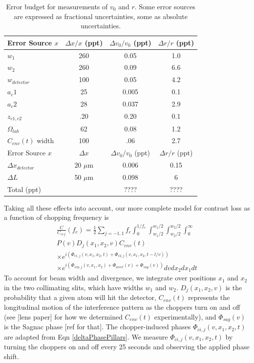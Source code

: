\documentclass[twocolumn, prl,showpacs,superscriptaddress]{revtex4-1}   %
\newcommand{\eqnref}[1]{Eqn \ref{#1}}
\begin{document}
\begingroup
\begin{table}
\caption{\label{velPolError}Error budget for measurements of $v_0$ and $r$. Some error sources are expressed as fractional uncertainties, some as absolute uncertainties.}
\begin{center}
\begin{tabular}{l c c c}
\hline\hline
Error Source $x$ & $\Delta x/x$ (ppt) & $\Delta v_0/v_0$ (ppt) & $\Delta r/r$ (ppt) \\
\hline
$w_1$ & 260 & 0.05 & 1.0 \\
$w_2$ & 260 & 0.09 & 6.6 \\
$w_{detector}$ & 100 & 0.05 & 4.2 \\
$a_c1$ & 25 & 0.005 & 0.1 \\
$a_c2$ & 28 & 0.037 & 2.9 \\
$z_{c1,c2}$ & .20 & 0.20 & 0.1 \\
$\Omega_{lab}$ & 62 & 0.08 & 1.2 \\
$C_{env}(t)$ width & 100 & .06 & 2.7 \\
\hline
Error Source $x$ & $\Delta x$ & $\Delta v_0/v_0$ (ppt) & $\Delta r/r$ (ppt) \\
\hline
$\Delta x_{detector}$ & 20 $\mu$m & 0.006 & 0.15 \\
$\Delta L$ & 50 $\mu$m & 0.098 & 6 \\
\hline
Total (ppt) & & ???? & ???? \\
\hline\hline
\end{tabular}
\end{center}
\end{table}
\endgroup

Taking all these effects into account, our more complete model for contrast loss as a function of chopping frequency is
\begin{align}
	\frac{C}{C_{ref}}(f_c) = 
		\frac{1}{2} \sum_{j=-1,1}
		f_c \int_0^{1/f_c} 
		\int_{w_1/2}^{w_1/2}
		\int_{w_2/2}^{w_2/2}
		\int_0^{\infty}           
		\nonumber \\
		P(v)
		D_j(x_1, x_2, v)
		C_{env}(t)                   
		\nonumber \\ \times
		e^{i( \Phi_{c1,j}(v,x_1,x_2,t) + \Phi_{c2,j}(v,x_1,x_2,t-l/v) )}
		\nonumber \\ \times
		e^{i( \Phi_{sep,j}(v,x_1,x_2) + \Phi_{accel}(v) + \Phi_{sag}(v) )}
		dv dx_{2} dx_{1} dt	
	\label{CvCF}
\end{align}
To account for beam width and divergence, we integrate over positions $x_1$ and $x_2$ in the two collimating slits, which have widths $w_1$ and $w_2$. $D_j(x_1, x_2, v)$ is the probability that a given atom will hit the detector, $C_{env}(t)$ represents the longitudinal motion of the interference pattern as the choppers turn on and off (see [lens paper] for how we determined $C_{env}(t)$ experimentally), and $\Phi_{sag}(v)$ is the Sagnac phase [ref for that]. The chopper-induced phases $\Phi_{ci,j}(v,x_1,x_2,t)$ are adapted from \eqnref{deltaPhasePillars}. 
We measure $\Phi_{ci,j}(v,x_1,x_2,t)$ by turning the choppers on and off every 25 seconds and observing the applied phase shift. 
	
\end{document}

